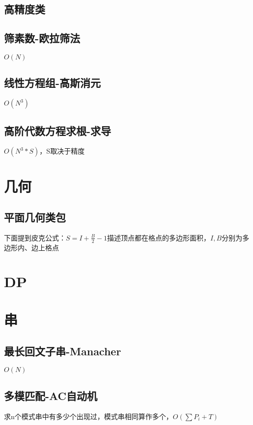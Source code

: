 \documentclass[10pt]{article}
\begin{document}
\subsection{高精度类}


\subsection{筛素数-欧拉筛法}
$O(N)$


\subsection{线性方程组-高斯消元}
$O(N^3)$


\subsection{高阶代数方程求根-求导}
$O(N^3*S)$，S取决于精度

\section{几何}
\subsection{平面几何类包}
下面提到皮克公式：$S=I+\frac{B}{2}-1$描述顶点都在格点的多边形面积，$I, B$分别为多边形内、边上格点

\section{DP}
\section{串}
\subsection{最长回文子串-Manacher}
$O(N)$

\subsection{多模匹配-AC自动机}
求n个模式串中有多少个出现过，模式串相同算作多个，$O(\sum P_i+T)$

\end{document}
